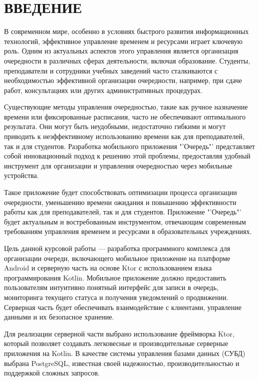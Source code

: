 \chapter*{ВВЕДЕНИЕ}

В современном мире, особенно в условиях быстрого развития информационных
технологий, эффективное управление временем и ресурсами играет ключевую роль.
Одним из актуальных аспектов этого управления является организация очередности
в различных сферах деятельности, включая образование.
Студенты, преподаватели и сотрудники учебных заведений часто сталкиваются
с необходимостью эффективной организации очередности, например,
при сдаче работ, консультациях или других административных процедурах.\par
Существующие методы управления очередностью,
такие как ручное назначение времени или фиксированные расписания,
часто не обеспечивают оптимального результата. Они могут быть неудобными,
недостаточно гибкими и могут приводить к неэффективному использованию времени
как для преподавателей, так и для студентов.
Разработка мобильного приложения "'Очередь"'
представляет собой инновационный подход к решению этой проблемы,
предоставляя удобный инструмент для организации
и управления очередностью через мобильные устройства.\par
Такое приложение будет способствовать оптимизации процесса
организации очередности, уменьшению времени ожидания
и повышению эффективности работы как для преподавателей,
так и для студентов. Приложение "'Очередь"' будет актуальным
и востребованным инструментом, отвечающим современным требованиям управления
временем и ресурсами в образовательных учреждениях.\par
Цель данной курсовой работы --- разработка программного комплекса
для организации очереди, включающего мобильное приложение
на платформе Android и серверную часть
на основе Ktor с использованием языка программирования Kotlin.
Мобильное приложение должно предоставить пользователям интуитивно понятный
интерфейс для записи в очередь, мониторинга текущего статуса
и получения уведомлений о продвижении. Серверная часть будет обеспечивать
взаимодействие с клиентами, управление данными и их безопасное хранение.\par
Для реализации серверной части выбрано использование фреймворка Ktor,
который позволяет создавать легковесные и производительные серверные
приложения на Kotlin. В качестве системы управления базами данных (СУБД)
выбрана PostgreSQL, известная своей надежностью,
производительностью и поддержкой сложных запросов.\par
